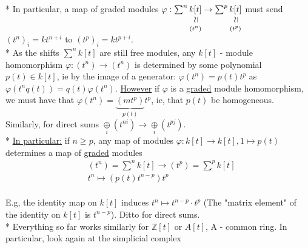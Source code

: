 \documentclass[11pt,a4paper]{report}
\newcommand{\vertsimeq}{\rotatebox{90}{$\,\simeq$}}
\newcommand{\simequalto}[2]{\underset{\scriptstyle\overset{\mkern4mu\vertsimeq}{#2}}{#1}}
\begin{document}
              * In particular, a map of graded modules $\varphi: \sum^n\simequalto{k[t]}{(t^n)} \rightarrow \sum^p\simequalto{k[t]}{(t^p)}$ must send $(t^n)_i = kt^{n+i}$ to $(t^p)_i = kt^{p+i}$.\\
              * As the shifts $\sum^nk[t]$ are still free modules, any $k[t]$ - module homomorphism $\varphi: (t^n) \rightarrow (t^n)$ is determined by some polynomial $p(t) \in k[t]$, ie by the image of a generator: $\varphi(t^n) = p(t)t^p$ as $\varphi(t^nq(t)) = q(t)\varphi(t^n)$. \underline{However} if $\varphi$ is a \underline{graded} module homomorphism, we must have that $\varphi(t^n) = \underbrace{(mt^p)}_{p(t)}t^p$, ie, that $p(t)$ be homogeneous. Similarly, for direct sums $\underset{i}{\oplus}(t^{ni}) \rightarrow \underset{i}{\oplus}(t^{pj})$.\\
              * \underline{In particular:} if $n \ge p$, any map of modules $\varphi: k[t] \rightarrow k[t], 1 \mapsto p(t)$ determines a map of \underline{graded} modules
              \begin{align*}
                &(t^n) = \sum^nk[t] \rightarrow (t^p) = \sum^pk[t]\\
                &t^n \mapsto (p(t)t^{n-p})t^p
              \end{align*}
              \\
              E.g, the identity map on $k[t]$ induces $t^n \mapsto t^{n-p} \cdot t^p$ (The "matrix element" of the identity on $k[t]$ is $t^{n-p}$). Ditto for direct sums.\\
              * Everything so far works similarly for $\mathbb{Z}[t]$ or $A[t]$, A - common ring. In particular, look again at the simplicial complex \cite{Zomorodian_Carlsson_2005}




 


 
 
\end{document}
